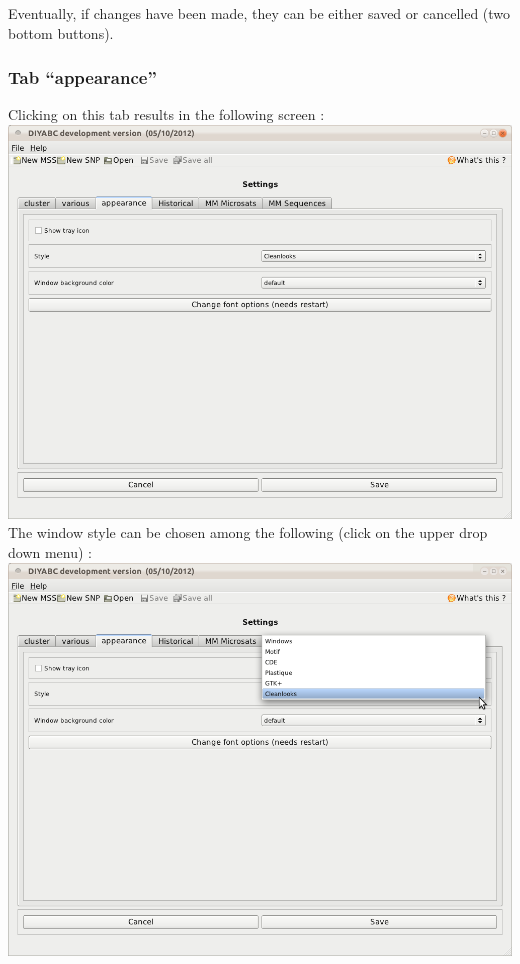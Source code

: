 Eventually, if changes have been made, they can be either saved or cancelled (two bottom buttons).

\subsubsection{Tab \textsf{``appearance''}}

Clicking on this tab results in the following screen :\\

\includegraphics[scale=0.33]{gui_pictures/Capture-DIYABC-98.png} \\

The window style can be chosen among the following (click on the upper drop down menu) :\\

\includegraphics[scale=0.33]{gui_pictures/Capture-DIYABC-99.png} \\

